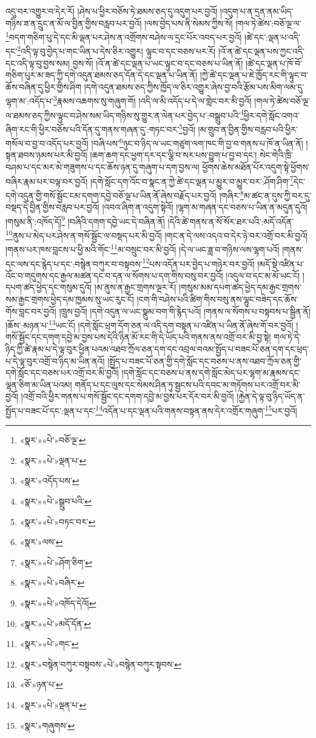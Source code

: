 འདུ་བར་འགྱུར་བ་དེར་རོ། །ཤེས་པ་ཕྱིར་བཅོས་ཏེ་ཐམས་ཅད་དུ་འདུག་པར་བྱའོ། །འདུག་པ་ན་དྲན་ནམ་ཡིད་གཉིས་ཟ་ན་དྲུང་ན་མོ་ལ་བྱིན་གྱིས་བརླབ་པར་བྱའོ། །ལས་བྱེད་པས་ནི་སེམས་ཀྱིས་སོ། །གལ་ཏེ་ཚེས་:བཅོ་ལྔ་ལ་\footnote{«སྣར་»«པེ་»བཅོ་ལྔ་}བདག་གཅིག་པུ་དེ་དང་མི་ལྡན་པར་ཤེས་ན་འགྲོགས་བཤེས་ལ་དྲང་པོར་འབད་པར་བྱའོ། །ཚེ་དང་:ལྡན་པ་འདི་དང་\footnote{«སྣར་»«པེ་»ལྡན་པ་}འདི་ལྟ་བུ་བྱེད་པ་གང་ཡིན་པ་དེས་ཅིར་འགྱུར། ལྟུང་བ་དང་བཅས་པར་རོ། །འོ་ན་ཚེ་དང་ལྡན་པས་ཀྱང་འདི་དང་འདི་ལྟ་བུ་བྱས་སམ། བྱས་སོ། །འོ་ན་ཚེ་དང་ལྡན་པ་ཡང་ལྟུང་བ་དང་བཅས་པ་ཡིན་ནོ། །ཚེ་དང་ལྡན་པ་ཁོ་བོ་གཅིག་པུར་མ་ཟད་ཀྱི་དགེ་འདུན་ཐམས་ཅད་དོན་དེ་དང་ལྡན་པ་ཡིན་ནོ། །ཀྱེ་ཚེ་དང་ལྡན་པ་ཇེ་ཁྱོད་རང་གི་ལྟུང་བ་ཆོས་བཞིན་དུ་ཕྱིར་གྱིས་ཤིག །དགེ་འདུན་ཐམས་ཅད་ཀྱིས་ཁྱོད་ལ་ཅིར་འགྱུར་ཞེས་བྱ་བའི་རྩོམ་པས་མིག་ལམ་དུ་ལྷག་མ་:འདོད་པ་\footnote{«སྣར་»འདོད་པས་}རྣམས་འཆགས་སུ་གཞུག་གོ། །འདི་ལ་མི་འདོད་པ་དེ་ལ་གླེང་བར་མི་བྱའོ། །གལ་ཏེ་ཚེས་བཅོ་ལྔ་ལ་ཐམས་ཅད་ཀྱིས་ལྟུང་བ་ཤེས་སམ་ཡིད་གཉིས་སུ་གྱུར་ན་ལེན་པར་བྱེད་པ་:བསྒྲུབ་པའི་\footnote{«སྣར་»«པེ་»སྒྲུབ་པའི་}ཕྱིར་དགེ་སློང་འགའ་ཞིག་རང་གི་ཕྱིར་བཅོས་པའི་དོན་དུ་གནས་གཞན་དུ་:གཏང་བར་\footnote{«སྣར་»«པེ་»བཏང་བར་}བྱའོ། །མ་གྲུབ་ན་བྱིན་གྱིས་བརླབ་པའི་ཕྱིར་གསོལ་བ་བྱ་བ་འདོད་པར་བྱའོ། །བཞི་པས་\footnote{«སྣར་»ལས་}ཉུང་བ་ཉིད་ལ་ཡང་གཙུག་ལག་ཁང་གི་བྱ་བ་གནས་པ་ཁོ་ན་ཡིན་ནོ། །སྟན་ཐབས་ཉམས་པར་མི་བྱའོ། །ཆག་ཆག་དང་ཕྱག་དར་དང་ལྕི་བ་སར་པས་བྱུག་པ་བྱ་བ་དང་། སེང་གེའི་ཁྲི་བཤམ་པ་དང་མར་མེ་གཟུགས་པ་དང་ཆོས་ཉན་དུ་གཞུག་པ་དག་བྱས་ལ། ཕྱོགས་ཆེས་མཐོན་པོར་འདུག་སྟེ་ཕྱོགས་བཞིར་རྣམ་པར་བལྟ་བར་བྱའོ། །དགེ་སློང་དག་འོང་བ་སྣང་ན་ཀྱེ་ཚེ་དང་ལྡན་པ་མྱུར་བ་མྱུར་བར་:ཤོག་ཤིག་\footnote{«སྣར་»«པེ་»ཤོག་ཅིག་}དེང་དགེ་འདུན་གྱི་གསོ་སྦྱོང་ངམ་དགག་དབྱེ་བཅོ་ལྔ་པ་ཡིན་ནོ་ཞེས་བརྗོད་པར་བྱའོ། །གཞིར་\footnote{«སྣར་»«པེ་»བཞིར་}མ་ཚང་ན་དུས་ཀྱི་བར་དུ་བསྡད་དེ་བྱིན་གྱིས་བརླབ་པར་བྱའོ། །འབའ་ཞིག་ན་འདུག་སྟེའོ། །ལྷག་མ་གཞན་དང་བཅས་པ་ཡིན་ན་མདུན་དུའོ། །གསུམ་ནི་:འཁོད་དོ།\footnote{«སྣར་»«པེ་»འཁོད་དེའོ།} །བཞིའི་དགག་དབྱེ་ཡང་དེ་བཞིན་ནོ། །དེའི་ཚེ་གནས་ན་སོ་སོར་ཐར་པའི་:མདོ་འདོན་\footnote{«སྣར་»«པེ་»མདོ་དོན་}ནུས་པ་མེད་པར་ཤེས་ན་གསོ་སྦྱོང་ལ་བསྡད་པར་མི་བྱའོ། །གང་ན་དེ་ལས་འདའ་བ་དེར་ཉེ་བར་འགྲོ་བར་མི་བྱའོ། །གནས་པར་ཁས་བླངས་པ་ཕྱི་མའི་གོང་\footnote{«སྣར་»«པེ་»གང་}མ་བསྲུང་བར་མི་བྱའོ། །དེ་ལ་ཡང་ཟླ་བ་གཉིས་ལས་ལྷག་པའོ། །གནས་དང་ལས་དང་རྙེད་པ་དང་:བསྙེན་བཀུར་བ་བསྟབས་\footnote{«སྣར་»བསྙེན་བཀུར་བསྟབས་«པེ་»བསྙེན་བཀུར་སྟབས་}པས་འདོན་པར་བྱེད་པ་གཉེར་བར་བྱའོ། །མདོ་སྡེ་འཛིན་པ་འོང་བ་གདུགས་དང་རྒྱལ་མཚན་དང་བ་དན་ལ་སོགས་པ་དག་གིས་བསུ་བར་བྱའོ། །འདུལ་བ་དང་མ་མོ་ཡང་ངོ། །དཔག་ཚད་ཕྱེད་དང་གསུམ་དུའོ། །མ་ནུས་ན་རྒྱང་གྲགས་ལྔར་རོ། །གསུམ་མམ་དཔག་ཚད་ཕྱེད་དམ་རྒྱང་གྲགས་སམ་རྒྱང་གྲགས་ཕྱེད་དམ་ཁྱམས་སུ་ཡང་རུང་ངོ། །ངག་གི་བཤེས་པའི་ཚིག་གིས་བསུ་ནས་ལྷུང་བཟེད་དང་ཆོས་གོས་བླང་བར་བྱའོ། །ཁྲུས་བྱའོ། །དགེ་འདུན་ལ་ཡང་སྣུམ་བག་གི་རྙེད་པའོ། །གནས་ལ་སོགས་པ་བསྟབས་པ་སྦྱིན་ནོ། །ཆོས་:མཉན་པ་\footnote{«ཅོ་»ཉན་པ་}ཡང་ངོ། །དགེ་སློང་ཕྲག་དོག་ཅན་ལ་འདི་དག་བསྟན་པ་འཛིན་པ་ཡིན་ནོ་ཞེས་གོ་བར་བྱའོ། །གསོ་སྦྱོང་དང་དགག་དབྱེ་མ་བྱས་པས་དེའི་ཉིན་མོ་རང་གི་དེ་ཡོད་པའི་གནས་ནས་འགྲོ་བར་མི་བྱ་སྟེ། གལ་ཏེ་དེ་ཉིད་ཀྱི་ཚེ་རྣམ་པ་དེ་ལྟ་བུར་ཕྱིན་པའམ་འཐབ་ཀྲོལ་ཅན་དག་དང་འབྲལ་བའམ་སྤྱོད་པ་བཟང་པོ་ཅན་དག་དང་ཕྲད་པ་དེ་ལྟ་བུར་འགྲོ་བ་ཉིད་མ་ཡིན་ནའོ། །སྤྱོད་པ་བཟང་པོ་ཅན་གྱི་དགེ་སློང་དང་བཅས་པ་ནས་འཐབ་ཀྲོལ་ཅན་གྱི་དགེ་སློང་དང་བཅས་པར་འགྲོ་བར་མི་བྱའོ། །དགེ་སློང་དང་བཅས་པ་ནས་དགེ་སློང་མེད་པར་ལྷག་མ་རྣམས་དང་ལྷན་ཅིག་མ་ཡིན་པའམ། གནོད་པ་དང་ལུས་དང་སེམས་ཤིན་ཏུ་སྦྱངས་པའི་དབང་མ་གཏོགས་པར་འགྲོ་བར་མི་བྱའོ། །འགྲོ་བའི་ཕྱིར་གནས་པ་གསོ་སྦྱོང་དང་དགག་དབྱེ་མ་བྱས་པར་དོར་བར་མི་བྱའོ། །རྐྱེན་དེ་ལྟ་བུ་ཉིད་ཡོད་ན་སྤྱོད་པ་བཟང་པོ་དང་:ལྡན་པ་དང་\footnote{«སྣར་»«པེ་»ལྡན་པ་}འདོན་པ་དང་ལྡན་པའི་གནས་བསྟན་ནས་དེར་འགྲོར་གཞུག་\footnote{«སྣར་»གཞུགས་}པར་བྱའོ། 